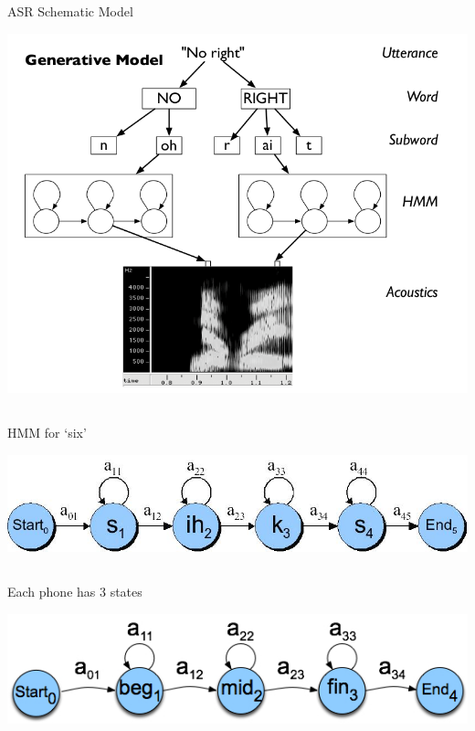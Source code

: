 \documentclass[9pt,xcolor=pdftex,dvipsnames,table]{beamer}
\begin{document}
\subsection{}
\begin{frame}{ASR Schematic Model}

	\begin{center}
    \includegraphics[scale=.35]{ASR-hierarchical}
	\end{center}
	
\end{frame}

\subsection{}
\begin{frame}{HMM for `six'}

	\begin{center}
    \includegraphics[scale=.3]{ASR9-6.jpg}
	\end{center}
\end{frame}

\subsection{}
\begin{frame}{Each phone has 3 states}

	\begin{center}
    \includegraphics[scale=.5]{ASR9-6a.jpg}
	\end{center}
\end{frame}
\end{document}
